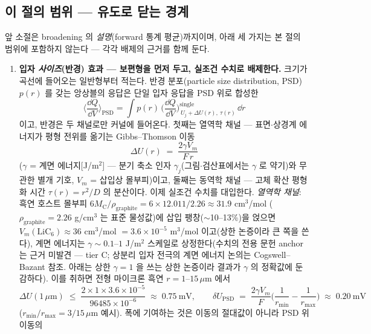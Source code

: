 \subsection{이 절의 범위 --- 유도로 닫는 경계}\label{sec:broadening-scope}
앞 소절은 broadening 의 \emph{설명}(forward 통계
평균)까지이며, 아래 세 가지는 본 절의 범위에 포함하지 않는다 --- 각각 배제의 근거를 함께 둔다.
\begin{enumerate}[label=(\roman*),leftmargin=2.2em,itemsep=2.5pt]
\item \textbf{입자 \emph{사이즈}(반경) 효과 --- 보편형을 먼저 두고, 실조건 수치로 배제한다.} 크기가 곡선에
들어오는 일반형부터 적는다. 반경 분포(particle size distribution, PSD) $p(r)$ 를 갖는 앙상블의 응답은
단일 입자 응답을 PSD 위로 합성한
\begin{equation}
\Big\langle\frac{\dd Q}{\dd V}\Big\rangle_\mathrm{PSD}
=\int p(r)\,\Big(\frac{\dd Q}{\dd V}\Big)^{\mathrm{single}}_{\,U_j+\Delta U(r),\ \tau(r)}\,\dd r
\label{eq:psdconv}
\end{equation}
이고, 반경은 두 채널로만 커널에 들어온다. 첫째는 열역학 채널 --- 표면$\cdot$상경계 에너지가 평형 전위를
옮기는 Gibbs--Thomson 이동
\begin{equation}
\Delta U(r)\;=\;\frac{2\gamma V_m}{F\,r}
\label{eq:gibbsthomson}
\end{equation}
($\gamma$ = 계면 에너지[J/m$^2$] --- 분기 축소 인자 $\gamma_j$(그림$\cdot$검산표에서는 $\gamma$ 로
약기)와 무관한 별개 기호, $V_m$ = 삽입상
몰부피)이고, 둘째는 동역학 채널 --- 고체 확산 평형화 시간
$\tau(r)=r^2/D$ 의 분산이다. 이제 실조건 수치를 대입한다. \emph{열역학 채널}: 흑연 호스트 몰부피
$6M_\mathrm{C}/\rho_\mathrm{graphite}=6\times12.011/2.26\approx31.9$ cm$^3$/mol
($\rho_\mathrm{graphite}=2.26$ g/cm$^3$ 는 표준 물성값)에 삽입 팽창($\sim$10--13\%)을 얹으면
$V_m(\mathrm{LiC_6})\approx36$ cm$^3$/mol $=3.6\times10^{-5}$ m$^3$/mol 이고(상한 논증이라 큰 쪽을 쓴다),
계면 에너지는 $\gamma\sim0.1$--$1$ J/m$^2$ 스케일로 상정한다(수치의 전용 문헌 anchor 는 근거 미발견 ---
tier C; 상분리 입자 전극의 계면 에너지 논의는 Cogswell--Bazant\cite{cogswell2012} 참조. 아래는 상한
$\gamma=1$ 을 쓰는 상한 논증이라 결과가 $\gamma$ 의 정확값에 둔감하다). 이를 취하면
전형 마이크론 흑연 $r=1$--$15\,\mu$m 에서
\[
\Delta U(1\,\mu\mathrm m)\;\le\;\frac{2\times1\times3.6\times10^{-5}}{96485\times10^{-6}}
\;\approx\;0.75\ \mathrm{mV},
\qquad
\delta U_\mathrm{PSD}\;=\;\frac{2\gamma V_m}{F}\Big(\frac{1}{r_{\min}}-\frac{1}{r_{\max}}\Big)
\;\approx\;0.20\ \mathrm{mV}
\]
($r_{\min}/r_{\max}=3/15\,\mu$m 예시). 폭에 기여하는 것은 이동의 절대값이 아니라 PSD 위 이동의

\end{enumerate}
